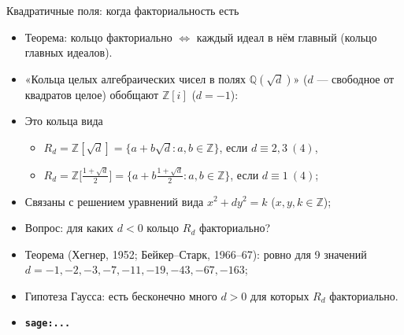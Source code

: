 \documentclass[serif, aspectratio=169]{beamer}
\newcommand{\sagemark}{%
  \textcolor{green!40!black}{\textbf{\texttt{sage:...}}}%
}
\begin{document}
\begin{frame}{Квадратичные поля: когда факториальность есть}
    \begin{itemize}
        \item Теорема: кольцо факториально $\Leftrightarrow$ каждый идеал в нём главный (кольцо главных идеалов).
        \item «Кольца целых алгебраических чисел в полях $\mathbb{Q}(\sqrt d)$» ($d$ --- свободное от квадратов целое) обобщают $\mathbb{Z}[i]$ ($d=-1$):
        \item Это кольца вида
        \begin{itemize}
            \item $R_d=\mathbb{Z}[\sqrt d]=\{a+b\sqrt d: a,b\in\mathbb{Z}\}$, если $d\equiv2,3\ (4)$,
            \item $R_d=\mathbb{Z}\big[\tfrac{1+\sqrt d}2\big]=\{a+b\tfrac{1+\sqrt d}2: a,b\in\mathbb{Z}\}$, если $d\equiv1\ (4)$;
        \end{itemize}
        \item Связаны с решением уравнений вида $x^2+dy^2=k$ ($x,y,k\in\mathbb{Z}$);
        \item Вопрос: для каких $d<0$ кольцо $R_d$ факториально?
        \item Теорема (Хегнер, 1952; Бейкер--Старк, 1966--67): ровно для 9 значений $d=-1,-2,-3,-7,-11,-19,-43,-67,-163$;
        \item Гипотеза Гаусса: есть бесконечно много $d>0$ для которых $R_d$ факториально.
        \item \sagemark
    \end{itemize}
\end{frame}
\end{document}
